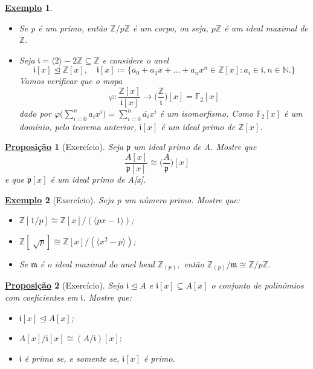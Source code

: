 \documentclass{article}
\newtheorem*{prop*}{\underline{Proposi\c c\~ao}}
\newtheorem{example}{\underline{Exemplo}}
\begin{document}
    \begin{example}
      \begin{itemize}
        \item[1)] Se p é um primo, então \(\mathbb{Z}/p \mathbb{Z}\) é um corpo, ou seja, \(p \mathbb{Z}\) é um ideal maximal de \(\mathbb{Z}.\)
        \item[2)] Seja \(\mathfrak{i} = \langle 2 \rangle - 2 \mathbb{Z}\subseteq \mathbb{Z}\) e considere o anel 
          \[
            \mathfrak{i}[x] \trianglelefteq \mathbb{Z}[x],\quad  \mathfrak{i}[x]\coloneqq \{a_{0}+a_{1}x+\dotsc +a_{n}x^{n}\in \mathbb{Z}[x]: a_{i}\in \mathfrak{i}, n\in \mathbb{N}.\}
          \]
          Vamos verificar que o mapa 
          \[
            \varphi : \frac{\mathbb{Z}[x]}{\mathfrak{i}[x]}\rightarrow \biggl(\frac{\mathbb{Z}}{\mathfrak{i}}\biggr)[x] = \mathbb{F}_{2}[x]
          \]
          dado por \(\varphi \biggl(\sum\limits_{i=0}^{n}a_{i}x^{i}\biggr) = \sum\limits_{i=0}^{n}\overline{a_{i}}x^{i}\) é um isomorfismo. Como \(\mathbb{F}_{2}[x]\) é um domínio,
          pelo teorema anterior, \(\mathfrak{i}[x]\) é um ideal primo de \(\mathbb{Z}[x]\).
      \end{itemize}
    \end{example}
    \begin{prop*}[Exercício]
      Seja \(\mathfrak{p}\) um ideal primo de A. Mostre que 
      \[
        \frac{A[x]}{\mathfrak{p}[x]}\cong{\biggl(\frac{A}{\mathfrak{p}}\biggr)}[x]
      \]  
      e que \(\mathfrak{p}[x]\) é um ideal primo de A[x].
    \end{prop*}
    \begin{example}[Exercício]
      Seja p um número primo. Mostre que:
      \begin{itemize}
        \item[1)] \(\mathbb{Z}[1/p]\cong \mathbb{Z}[x]/(\langle px-1 \rangle)\);
        \item[2)] \(\mathbb{Z}[\sqrt[]{p}]\cong \mathbb{Z}[x]/(\langle x^{2}-p \rangle)\);
        \item[3)] Se \(\mathfrak{m}\) é o ideal maximal do anel local \(\mathbb{Z}_{(p)},\) então \(\mathbb{Z}_{(p)}/\mathfrak{m}\cong{\mathbb{Z}/p \mathbb{Z}}.\)
      \end{itemize}
    \end{example}
    \begin{prop*}[Exercício]
      Seja \(\mathfrak{i}\trianglelefteq{A}\) e \(\mathfrak{i}[x]\subseteq A[x]\) o conjunto de polinômios 
      com coeficientes em \(\mathfrak{i}.\) Mostre que:
      \begin{itemize}
        \item[1)] \(\mathfrak{i}[x] \trianglelefteq{A[x]}\);
        \item[2)] \(A[x]/\mathfrak{i}[x]\cong{(A/\mathfrak{i})}[x];\)
        \item[3)] \(\mathfrak{i}\) é primo se, e somente se, \(\mathfrak{i}[x]\) é primo.
      \end{itemize}
    \end{prop*}
\end{document}

